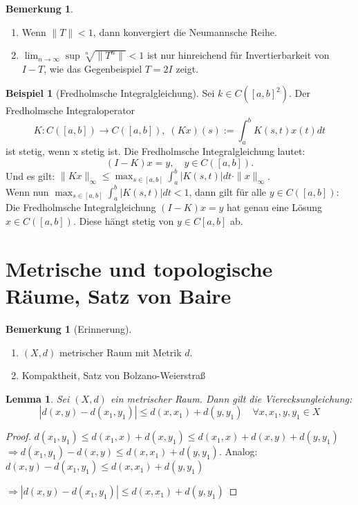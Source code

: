\documentclass[ngerman]{report}
\theoremstyle{plain}%
\newtheorem{lemma}[thm]{Lemma}
\theoremstyle{definition}%
\newtheorem{bsp}[thm]{Beispiel}
\theoremstyle{myStyle}
\newtheorem{bem}[thm]{Bemerkung}
\newcommand{\norm}[1]{\|#1\|}
\newcommand{\df}[1][]{%
	\overset{#1}{\Rightarrow}
}
\newcommand{\limes}[1][\infty]{\lim_{n \to #1}}
\newcommand{\disp}{\displaystyle}
\begin{document}
	\begin{bem}
		\begin{enumerate}
			\item Wenn $\norm{T} < 1$, dann konvergiert die Neumannsche Reihe.
			\item $\disp \limes\sup\sqrt[n]{\norm{T^n}} <1$ ist nur hinreichend für Invertierbarkeit von $I-T$, wie das Gegenbeispiel $T = 2I$ zeigt.
		\end{enumerate}
	\end{bem}
\begin{bsp}[Fredholmsche Integralgleichung]
Sei $k\in C([a,b]^2)$.
Der Fredholmsche Integraloperator $$K:C([a,b])\to C([a,b]),\; (Kx)(s):=\int^b_a K(s,t)x(t)dt$$ ist stetig, wenn x stetig ist.
Die Fredholmsche Integralgleichung lautet: $$(I-K)x=y,\quad y\in C([a,b]).$$
Und es gilt: $\displaystyle \|Kx\|_\infty \leq \max_{s\in[a,b]} \int^b_a |K(s,t)|dt\cdot\|x\|_\infty$.\\
Wenn nun $\displaystyle \max_{s\in[a,b]} \int^b_a |K(s,t)|dt<1$, dann gilt für alle $ y\in C([a,b]):$
Die Fredholmsche Integralgleichung $(I-K)x=y$ hat genau eine Lösung $x\in C([a,b])$. Diese hängt stetig von $y\in C[a,b]$ ab.
\end{bsp}

\section{Metrische und topologische Räume, Satz von Baire}

\begin{bem}[Erinnerung]
\begin{enumerate}[-]
\item $(X,d)$ metrischer Raum mit Metrik $d$.

\item Kompaktheit, Satz von Bolzano-Weierstraß
\end{enumerate}
\end{bem}

\begin{lemma}
Sei $(X,d)$ ein metrischer Raum. Dann gilt die Vierecksungleichung:
$$|d(x,y)-d(x_1,y_1)| \leq d(x,x_1) +d(y,y_1)\quad \forall x,x_1,y,y_1\in X$$
\end{lemma}
\begin{proof}
$d(x_1,y_1) \leq d(x_1,x)+d(x,y_1) \leq d(x_1,x)+d(x,y)+d(y,y_1)$\\$\df d(x_1,y_1)-d(x,y) \leq d(x,x_1)+d(y,y_1)$. Analog: $d(x,y)-d(x_1,y_1) \leq d(x,x_1)+d(y,y_1)$\par
$\df |d(x,y) - d(x_1,y_1)| \leq d(x,x_1) +d(y,y_1)$
\end{proof}
\end{document}
